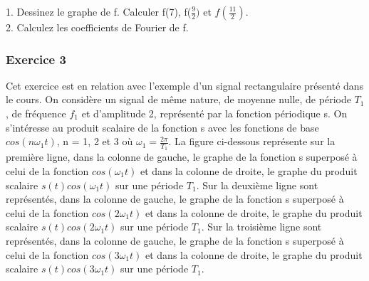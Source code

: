 \documentclass[11pt]{report}
\begin{document}
	1. Dessinez le graphe de f. Calculer f(7), f($\frac{9}{2})$ et $f(\frac{11}{2})$.\\
	
	2. Calculez les coefficients de Fourier de f.\\
	
	\subsubsection{Exercice 3}
	Cet exercice est en relation avec l'exemple d'un signal rectangulaire présenté dans le cours. On considère un signal de même nature, de moyenne nulle, de période $T_1$, de fréquence $f_1$ et	d'amplitude 2, représenté par la fonction périodique s. On s'intéresse au produit scalaire de la fonction s avec les fonctions de base $cos(n\omega_{1}t)$, n = 1, 2 et 3 où $\omega_{1} = \frac{2\pi}{T_1}$. La figure ci-dessous représente sur la première ligne, dans la colonne de gauche, le graphe de la fonction s superposé à celui de	la fonction $cos(\omega_{1}t)$ et dans la colonne de droite, le graphe du produit scalaire $s(t)cos(\omega_{1}t)$ sur
	une période $T_1$. Sur la deuxième ligne sont représentés, dans la colonne de gauche, le graphe de la fonction s superposé à celui de la fonction $cos(2\omega_{1}t)$ et dans la colonne de droite, le graphe	du produit scalaire $s(t)cos(2\omega_{1}t)$ sur une période $T_1$. Sur la troisième ligne sont représentés,
	dans la colonne de gauche, le graphe de la fonction s superposé à celui de la fonction  $cos(3\omega_{1}t)$	et dans la colonne de droite, le graphe du produit scalaire $s(t)cos(3\omega_{1}t)$ sur une période $T_1$. 
	
\end{document}
